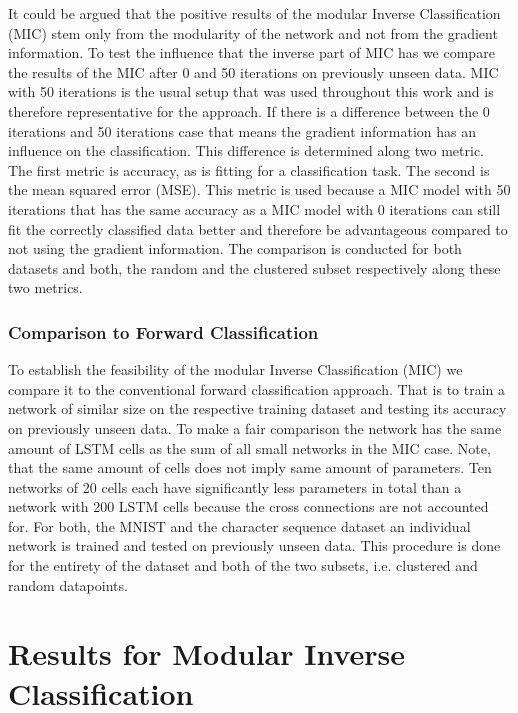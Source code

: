 \documentclass{article}
\begin{document}
It could be argued that the positive results of the modular Inverse Classification (MIC) stem only from the modularity of the network and not from the gradient information. To test the influence that the inverse part of MIC has we compare the results of the MIC after 0 and 50 iterations on previously unseen data. MIC with 50 iterations is the usual setup that was used throughout this work and is therefore representative for the approach. If there is a difference between the 0 iterations and 50 iterations case that means the gradient information has an influence on the classification. This difference is determined along two metric. The first metric is accuracy, as is fitting for a classification task. The second is the mean squared error (MSE). This metric is used because a MIC model with 50 iterations that has the same accuracy as a MIC model with 0 iterations can still fit the correctly classified data better and therefore be advantageous compared to not using the gradient information. The comparison is conducted for both datasets and both, the random and the clustered subset respectively along these two metrics. 

\subsubsection{Comparison to Forward Classification}

To establish the feasibility of the modular Inverse Classification (MIC) we compare it to the conventional forward classification approach. That is to train a network of similar size on the respective training dataset and testing its accuracy on previously unseen data. To make a fair comparison the network has the same amount of LSTM cells as the sum of all small networks in the MIC case. Note, that the same amount of cells does not imply same amount of parameters. Ten networks of 20 cells each have significantly less parameters in total than a network with 200 LSTM cells because the cross connections are not accounted for. For both, the MNIST and the character sequence dataset an individual network is trained and tested on previously unseen data. This procedure is done for the entirety of the dataset and both of the two subsets, i.e. clustered and random datapoints. 

\section{Results for Modular Inverse Classification}
\label{sec:results}
\end{document}
